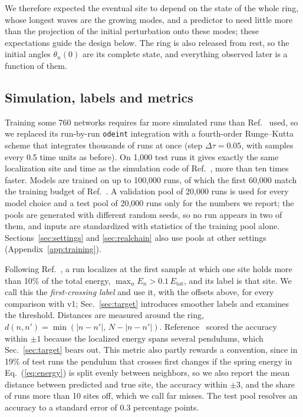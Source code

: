 \documentclass[11pt]{article}
\newcommand{\Etot}{E_{\mathrm{tot}}}
\begin{document}
We therefore expected the eventual site to depend on the state of the whole ring, whose longest waves are the growing modes, and a predictor to need little more than the projection of the initial perturbation onto these modes; these expectations guide the design below. The ring is also released from rest, so the initial angles $\theta_n(0)$ are its complete state, and everything observed later is a function of them.

\subsection{Simulation, labels and metrics}
\label{sec:pools}

Training some 760 networks requires far more simulated runs than Ref.~\cite{mittal2026jand} used, so we replaced its run-by-run \texttt{odeint} integration \cite{virtanen2020scipy} with a fourth-order Runge--Kutta scheme \cite{press1992numerical} that integrates thousands of runs at once (step $\Delta\tau=0.05$, with samples every 0.5 time units as before). On 1,000 test runs it gives exactly the same localization site and time as the simulation code of Ref.~\cite{mittal2026jand}, more than ten times faster. Models are trained on up to 100,000 runs, of which the first 60,000 match the training budget of Ref.~\cite{mittal2026jand}. A validation pool of 20,000 runs is used for every model choice and a test pool of 20,000 runs only for the numbers we report; the pools are generated with different random seeds, so no run appears in two of them, and inputs are standardized with statistics of the training pool alone. Sections~\ref{sec:settings} and \ref{sec:realchain} also use pools at other settings (Appendix~\ref{app:training}).

Following Ref.~\cite{mittal2026jand}, a run localizes at the first sample at which one site holds more than 10\% of the total energy, $\max_n E_n>0.1\,\Etot$, and its label is that site. We call this the \emph{first-crossing label} and use it, with the offsets above, for every comparison with v1; Sec.~\ref{sec:target} introduces smoother labels and examines the threshold. Distances are measured around the ring, $d(n,n')=\min(|n-n'|,\,N-|n-n'|)$. Reference~\cite{mittal2026jand} scored the accuracy within $\pm1$ because the localized energy spans several pendulums, which Sec.~\ref{sec:target} bears out. This metric also partly rewards a convention, since in 19\% of test runs the pendulum that crosses first changes if the spring energy in Eq.~(\ref{eq:energy}) is split evenly between neighbors, so we also report the mean distance between predicted and true site, the accuracy within $\pm3$, and the share of runs more than 10 sites off, which we call far misses. The test pool resolves an accuracy to a standard error of 0.3 percentage points.
\end{document}
